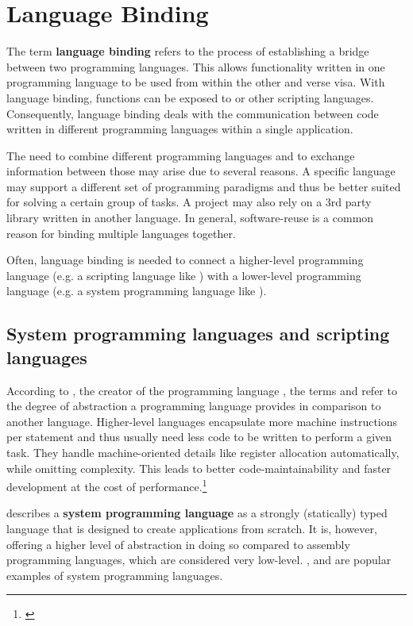 \chapter{Language Binding}
\label{chap:LanguageBinding}

The term \textbf{language binding} refers to the process of establishing a bridge between two programming languages. This allows functionality written in one programming language to be used from within the other and verse visa. With language binding,  functions can be exposed to  or other scripting languages. Consequently, language binding deals with the communication between code written in different programming languages within a single application.

The need to combine different programming languages and to exchange information between those may arise due to several reasons. A specific language may support a different set of programming paradigms and thus be better suited for solving a certain group of tasks. A project may also rely on a 3rd party library written in another language. In general, software-reuse is a common reason for binding multiple languages together.

Often, language binding is needed to connect a higher-level programming language (e.g. a scripting language like ) with a lower-level programming language (e.g. a system programming language like ).

\section{System programming languages and scripting languages}

According to , the creator of the programming language , the terms \textbf{} and \textbf{} refer to the degree of abstraction a programming language provides in comparison to another language. Higher-level languages encapsulate more machine instructions per statement and thus usually need less code to be written to perform a given task. They handle machine-oriented details like register allocation automatically, while omitting complexity. This leads to better code-maintainability and faster development at the cost of performance.\footnote{\citep{Ousterhout}}

 describes a \textbf{system programming language} as a strongly (statically) typed language that is designed to create applications from scratch. It is, however, offering a higher level of abstraction in doing so compared to assembly programming languages, which are considered very low-level. ,  and  are popular examples of system programming languages.

